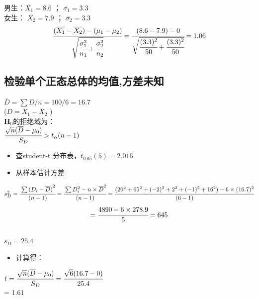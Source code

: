 男生：\(\overline{X_1} = 8.6\) ； \(\overline{\sigma_1} = 3.3\)\\
女生： \(\overline{X_2} = 7.9\) ； \(\overline{\sigma_2} = 3.3\)\\

\[\cfrac{ (\overline{X_1} - \overline{X_2}) - ({\mu}_1  - {\mu}_2)}{\sqrt{\cfrac{\sigma_1^2}{n_1} + \cfrac{\sigma_2^2}{n_2}}} = \cfrac{ (8.6 - 7.9) - 0 }{\sqrt{\cfrac{(3.3)^2}{50} + \cfrac{(3.3)^2}{50}}} = 1.06\]

\hypertarget{ux68c0ux9a8cux5355ux4e2aux6b63ux6001ux603bux4f53ux7684ux5747ux503cux65b9ux5deeux672aux77e5-1}{%
\subsection{检验单个正态总体的均值,方差未知}\label{ux68c0ux9a8cux5355ux4e2aux6b63ux6001ux603bux4f53ux7684ux5747ux503cux65b9ux5deeux672aux77e5-1}}

\(\overline{D} = \sum D / n = 100/6 = 16.7\)\\
(\(D = X_1 - X_2\) )\\
\(\mathbf{H}_0\)的拒绝域为：\\
\(\cfrac{ \sqrt{n}(\overline{D} - \mu _0) }{S_D}  > t_\alpha(n-1)\)\\

\begin{itemize}
\tightlist
\item
  查student-t 分布表，\(t_{0.05} (5) = 2.016\)
\item
  从样本估计方差\\
\end{itemize}

\(s_D^2 = \cfrac{\sum {(D_i - \overline{D})}^2  }{(n - 1)}= \cfrac{\sum D_i^2 - n \times \overline{D}^2  }{(n - 1)} = \cfrac{(20^2 + 65^2 + (-2)^2 + 2^2 + (-1)^2 + 16^2) - 6 \times (16.7)^2  }{(6 - 1)}\)\\
\[= \cfrac{4890 - 6 \times 278.9  }{5} = 645\]\\
\(s_D = 25.4\)\\

\begin{itemize}
\tightlist
\item
  计算得：
\end{itemize}

\(t = \cfrac{ \sqrt{n}(\overline{D} - \mu _0) }{S_D} = \cfrac{ \sqrt{6}(16.7 - 0) }{25.4}\)\\
= 1.61\\




